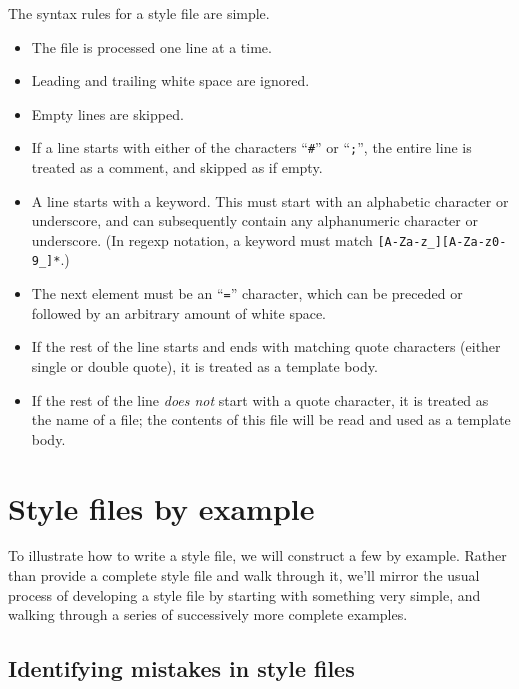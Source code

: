 {{The syntax rules for a style file are simple.

\begin{itemize}
\item The file is processed one line at a time.

\item Leading and trailing white space are ignored.

\item Empty lines are skipped.

\item If a line starts with either of the characters ``\texttt{\#}'' or
  ``\texttt{;}'', the entire line is treated as a comment, and skipped
  as if empty.

\item A line starts with a keyword.  This must start with an
  alphabetic character or underscore, and can subsequently contain any
  alphanumeric character or underscore.  (In regexp notation, a
  keyword must match \Verb+[A-Za-z_][A-Za-z0-9_]*+.)

\item The next element must be an ``\texttt{=}'' character, which can
  be preceded or followed by an arbitrary amount of white space.

\item If the rest of the line starts and ends with matching quote
  characters (either single or double quote), it is treated as a
  template body.

\item If the rest of the line \emph{does not} start with a quote
  character, it is treated as the name of a file; the contents of this
  file will be read and used as a template body.
\end{itemize}

\section{Style files by example}

To illustrate how to write a style file, we will construct a few by
example.  Rather than provide a complete style file and walk through
it, we'll mirror the usual process of developing a style file by
starting with something very simple, and walking through a series of
successively more complete examples.

\subsection{Identifying mistakes in style files}

}}

